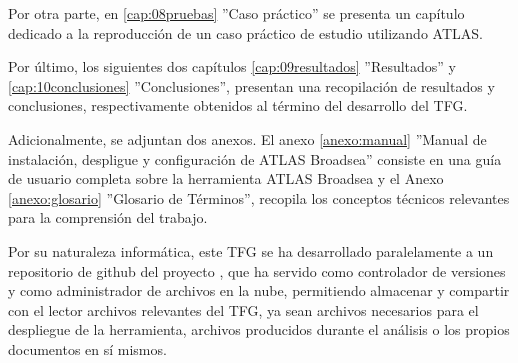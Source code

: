 Por otra parte, en \ref{cap:08pruebas} ''Caso práctico'' se presenta un capítulo dedicado a la reproducción de un caso práctico de estudio utilizando ATLAS. 

Por último, los siguientes dos capítulos \ref{cap:09resultados} ''Resultados'' y \ref{cap:10conclusiones} ''Conclusiones'', presentan una recopilación de resultados y conclusiones, respectivamente obtenidos al término del desarrollo del TFG. 

Adicionalmente, se adjuntan dos anexos. El anexo \ref{anexo:manual} ''Manual de instalación, despligue y configuración de ATLAS Broadsea'' consiste en una guía de usuario completa sobre la herramienta ATLAS Broadsea y el Anexo \ref{anexo:glosario} ''Glosario de Términos'', recopila los conceptos técnicos relevantes para la comprensión del trabajo. 

Por su naturaleza informática, este TFG se ha desarrollado paralelamente a un repositorio de github del proyecto \cite{vallealonsodc}, que ha servido como controlador de versiones y como administrador de archivos en la nube, permitiendo almacenar y compartir con el lector archivos relevantes del TFG, ya sean archivos necesarios para el despliegue de la herramienta, archivos producidos durante el análisis o los propios documentos en sí mismos.
